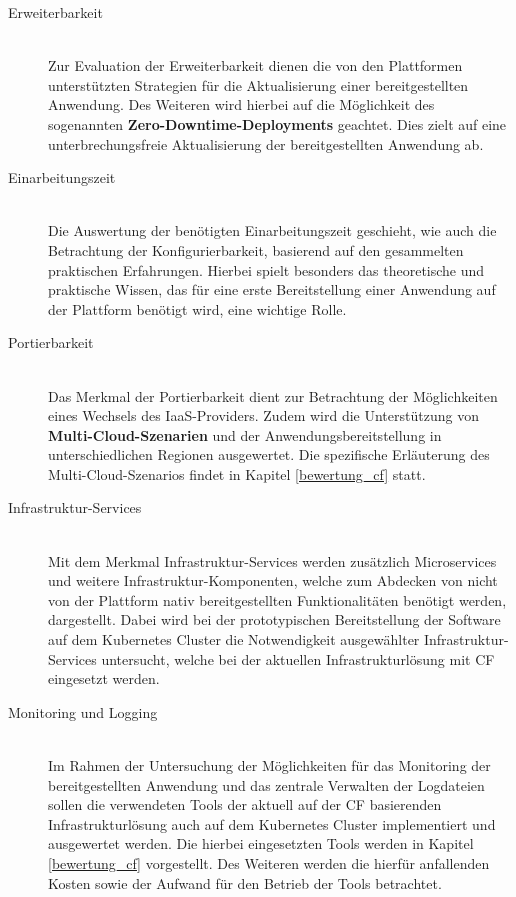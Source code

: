 \begin{description}
	\item[Erweiterbarkeit] \hfill \\
	Zur Evaluation der Erweiterbarkeit dienen die von den Plattformen unterstützten Strategien für die Aktualisierung einer bereitgestellten Anwendung. Des Weiteren wird hierbei auf die Möglichkeit des sogenannten \textbf{Zero-Downtime-Deployments} geachtet. Dies zielt auf eine unterbrechungsfreie Aktualisierung der bereitgestellten Anwendung ab.
	\item[Einarbeitungszeit] \hfill \\
	Die Auswertung der benötigten Einarbeitungszeit geschieht, wie auch die Betrachtung der Konfigurierbarkeit, basierend auf den gesammelten praktischen Erfahrungen. Hierbei spielt besonders das theoretische und praktische Wissen, das für eine erste Bereitstellung einer Anwendung auf der Plattform benötigt wird, eine wichtige Rolle.
	\item[Portierbarkeit] \hfill \\
	Das Merkmal der Portierbarkeit dient zur Betrachtung der Möglichkeiten eines Wechsels des \ac{IaaS}-Providers. Zudem wird die Unterstützung von \textbf{Multi-Cloud-Szenarien} und der Anwendungsbereitstellung in unterschiedlichen Regionen ausgewertet. Die spezifische Erläuterung des Multi-Cloud-Szenarios findet in Kapitel \ref{bewertung_cf} statt.
	\item[Infrastruktur-Services] \hfill \\
	Mit dem Merkmal Infrastruktur-Services werden zusätzlich Microservices und weitere Infrastruktur-Komponenten, welche zum Abdecken von nicht von der Plattform nativ bereitgestellten Funktionalitäten benötigt werden, dargestellt. Dabei wird bei der prototypischen Bereitstellung der Software auf dem Kubernetes Cluster die Notwendigkeit ausgewählter Infrastruktur-Services untersucht, welche bei der aktuellen Infrastrukturlösung mit \ac{CF} eingesetzt werden.   
	\item[Monitoring und Logging] \hfill \\
	Im Rahmen der Untersuchung der Möglichkeiten für das Monitoring der bereitgestellten Anwendung und das zentrale Verwalten der Logdateien sollen die verwendeten Tools der aktuell auf der \ac{CF} basierenden Infrastrukturlösung auch auf dem Kubernetes Cluster implementiert und ausgewertet werden. Die hierbei eingesetzten Tools werden in Kapitel \ref{bewertung_cf} vorgestellt. Des Weiteren werden die hierfür anfallenden Kosten sowie der Aufwand für den Betrieb der Tools betrachtet.
\end{description}
\newpage
